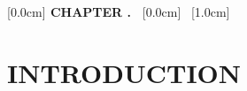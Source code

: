 \documentclass[a4paper,13pt,3p,twoside]{report}
\title{\bf \TITLE}
\author{\AUTHOR}
\theoremstyle{definition}
\begin{document}
 
% 

\newpage
{} %
% 

\newpage


\newpage
\renewcommand*\contentsname{TABLE OF CONTENTS}
[0.0cm]{\bfseries\vspace{0.3cm}}{{\bfseries{\scshape} CHAPTER \thecontentslabel.\ }}{}{\contentspage}
[0.0cm]{\vspace{0.3cm}}{\thecontentslabel \ }{}{\contentspage}
[1.0cm]{\vspace{0.3cm}}{\thecontentslabel \ }{}{\contentspage}

\tableofcontents 
\thispagestyle{empty}
\cleardoublepage


\renewcommand{\listfigurename}{LIST OF FIGURES}
{\let\oldnumberline\numberline
\renewcommand{\numberline}{Figure~\oldnumberline}
\listoffigures} 
\newpage

\renewcommand{\listtablename}{LIST OF TABLES}
{\let\oldnumberline\numberline
\renewcommand{\numberline}{Table~\oldnumberline}
\listoftables}

\glsaddall 
{}
\renewcommand*{\glossaryheader}{%
     \bfseries Abbreviation & \bfseries Full Term \\ 
     \endhead
}
\setlength{\glsdescwidth}{0.8\textwidth}
\renewcommand*{\glsgroupskip}{}
\renewcommand*{\acronymname}{LIST OF ABBREVIATIONS}
\printnoidxglossaries

\renewcommand\appendixname{APPENDIX}
\renewcommand\appendixpagename{APPENDIX}
\renewcommand\appendixtocname{APPENDIX}
\renewcommand{\figurename}{Figure}
\renewcommand{\tablename}{Table}
\renewcommand{\chaptername}{CHAPTER}

\newpage
{} %
\pagestyle{fancy}
\fancyhf{}
\fancyhead[RE, LO]{\leftmark}
\fancyfoot[RE, LO]{\thepage}

\chapter{INTRODUCTION}

\end{document}
